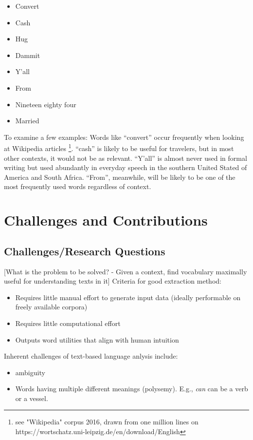 \begin{itemize}
	\item Convert
	\item Cash
	\item Hug
	\item Dammit
	\item Y'all
	\item From
	\item Nineteen eighty four
	\item Married
\end{itemize}

To examine a few examples: Words like “convert” occur frequently when looking at Wikipedia articles \footnote{see "Wikipedia" corpus 2016, drawn from one million lines on https://wortschatz.uni-leipzig.de/en/download/English}. “cash” is likely to be useful for travelers, but in most other contexts, it would not be as relevant. “Y’all” is almost never used in formal writing but used abundantly in everyday speech in the southern United Stated of America and South Africa. “From”, meanwhile, will be likely to be one of the most frequently used words regardless of context.

\section{Challenges and Contributions}

\subsection{Challenges/Research Questions}
[What is the problem to be solved? - Given a context, find vocabulary maximally useful for understanding texts in it]
Criteria for good extraction method:
\begin{itemize}
	\item Requires little manual effort to generate input data (ideally performable on freely available corpora)
	\item Requires little computational effort
	\item Outputs word utilities that align with human intuition 
\end{itemize}

Inherent challenges of text-based language anlysis include:
\begin{itemize}
	\item ambiguity
	\item Words having multiple different meanings (polysemy). E.g., \textit{can} can be a verb or a vessel.
\end{itemize}


